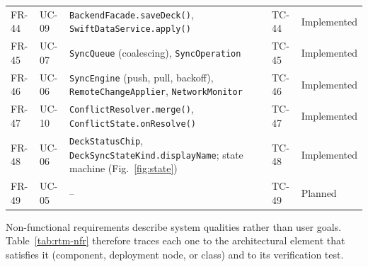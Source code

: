 \documentclass[12pt,letterpaper]{article}
\begin{document}
\begin{xltabular}{\textwidth}{@{}l L{1.6cm} Y l l@{}}
FR-44 & UC-09 & \texttt{BackendFacade.saveDeck()}, \texttt{SwiftDataService.apply()} & TC-44 & Implemented \\
FR-45 & UC-07 & \texttt{SyncQueue} (coalescing), \texttt{SyncOperation} & TC-45 & Implemented \\
FR-46 & UC-06 & \texttt{SyncEngine} (push, pull, backoff), \texttt{RemoteChangeApplier}, \texttt{NetworkMonitor} & TC-46 & Implemented \\
FR-47 & UC-10 & \texttt{ConflictResolver.merge()}, \texttt{ConflictState.onResolve()} & TC-47 & Implemented \\
FR-48 & UC-06 & \texttt{DeckStatusChip}, \texttt{DeckSyncStateKind.displayName}; state machine (Fig.~\ref{fig:state}) & TC-48 & Implemented \\
FR-49 & UC-05 & -- & TC-49 & Planned \\
\end{xltabular}

Non-functional requirements describe system qualities rather than user goals.
Table~\ref{tab:rtm-nfr} therefore traces each one to the architectural element that
satisfies it (component, deployment node, or class) and to its verification test.
\end{document}

